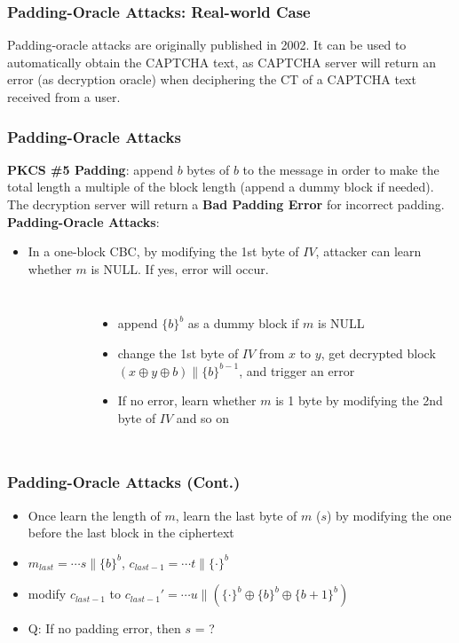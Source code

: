 \begin{frame}\frametitle{Padding-Oracle Attacks: Real-world Case}
Padding-oracle attacks are originally published in 2002. It can be used to automatically obtain the CAPTCHA text, as CAPTCHA server will return an error (as decryption oracle) when deciphering the CT of a CAPTCHA text received from a user.
\begin{figure}
\begin{center}

\end{center}
\end{figure}
\end{frame}
\begin{frame}\frametitle{Padding-Oracle Attacks}
\textbf{PKCS \#5 Padding}:  append $b$ bytes of $b$ to the message in order to make the total length a multiple of the block length (append a dummy block if needed). The decryption server will return a \textbf{Bad Padding Error} for incorrect padding.\\
\textbf{Padding-Oracle Attacks}: 
\begin{itemize}
\item In a one-block CBC, by modifying the 1st byte of $IV$, attacker can learn whether $m$ is NULL. If yes, error will occur. 
\end{itemize}
\begin{columns}[c]
\begin{figure}
\begin{center}

\end{center}
\end{figure}
\begin{itemize}
\item append $\{b\}^b$ as a dummy block if $m$ is NULL
\item change the 1st byte of $IV$ from $x$ to $y$, get decrypted block $(x \oplus y \oplus b) \| \{b\}^{b-1}$, and trigger an error
\item If no error, learn whether $m$ is 1 byte by modifying the 2nd byte of $IV$ and so on
\end{itemize}
\end{columns}
\end{frame}
\begin{frame}\frametitle{Padding-Oracle Attacks (Cont.)}
\begin{figure}
\begin{center}

\end{center}
\end{figure}
\begin{itemize}
\item Once learn the length of $m$, learn the last byte of $m$ ($s$) by modifying the one before the last block in the ciphertext
\item $m_{last} = \cdots s \| \{b\}^{b}$, $c_{last-1} = \cdots t \| \{\cdot \}^{b} $
\item modify $c_{last-1}$ to $c_{last-1}' = \cdots u \| (\{\cdot \}^{b} \oplus \{b\}^{b} \oplus \{b+1\}^{b}) $
\item \alert{Q: If no padding error, then $s$ = ?}
\end{itemize}
\end{frame}
